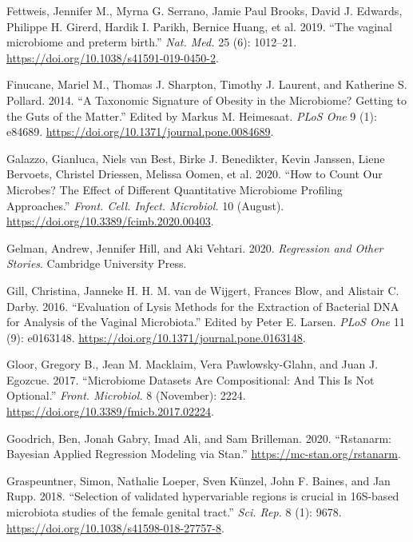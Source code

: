 \documentclass[
]{article}
\newlength{\cslhangindent}
\newlength{\cslentryspacingunit} %
\newenvironment{CSLReferences}[2] %
 {%
  \setlength{\parindent}{0pt}
  \ifodd #1
  \let\oldpar\par
  \def\par{\hangindent=\cslhangindent\oldpar}
  \fi
  \setlength{\parskip}{#2\cslentryspacingunit}
 }%
 {}
\begin{document}
\begin{CSLReferences}{1}{0}
\leavevmode{}%
Fettweis, Jennifer M., Myrna G. Serrano, Jamie Paul Brooks, David J. Edwards, Philippe H. Girerd, Hardik I. Parikh, Bernice Huang, et al. 2019. {``{The vaginal microbiome and preterm birth}.''} \emph{Nat. Med.} 25 (6): 1012--21. \url{https://doi.org/10.1038/s41591-019-0450-2}.

\leavevmode{}%
Finucane, Mariel M., Thomas J. Sharpton, Timothy J. Laurent, and Katherine S. Pollard. 2014. {``{A Taxonomic Signature of Obesity in the Microbiome? Getting to the Guts of the Matter}.''} Edited by Markus M. Heimesaat. \emph{PLoS One} 9 (1): e84689. \url{https://doi.org/10.1371/journal.pone.0084689}.

\leavevmode{}%
Galazzo, Gianluca, Niels van Best, Birke J. Benedikter, Kevin Janssen, Liene Bervoets, Christel Driessen, Melissa Oomen, et al. 2020. {``{How to Count Our Microbes? The Effect of Different Quantitative Microbiome Profiling Approaches}.''} \emph{Front. Cell. Infect. Microbiol.} 10 (August). \url{https://doi.org/10.3389/fcimb.2020.00403}.

\leavevmode{}%
Gelman, Andrew, Jennifer Hill, and Aki Vehtari. 2020. \emph{Regression and Other Stories}. Cambridge University Press.

\leavevmode{}%
Gill, Christina, Janneke H. H. M. van de Wijgert, Frances Blow, and Alistair C. Darby. 2016. {``{Evaluation of Lysis Methods for the Extraction of Bacterial DNA for Analysis of the Vaginal Microbiota}.''} Edited by Peter E. Larsen. \emph{PLoS One} 11 (9): e0163148. \url{https://doi.org/10.1371/journal.pone.0163148}.

\leavevmode{}%
Gloor, Gregory B., Jean M. Macklaim, Vera Pawlowsky-Glahn, and Juan J. Egozcue. 2017. {``{Microbiome Datasets Are Compositional: And This Is Not Optional}.''} \emph{Front. Microbiol.} 8 (November): 2224. \url{https://doi.org/10.3389/fmicb.2017.02224}.

\leavevmode{}%
Goodrich, Ben, Jonah Gabry, Imad Ali, and Sam Brilleman. 2020. {``Rstanarm: {Bayesian} Applied Regression Modeling via {Stan}.''} \url{https://mc-stan.org/rstanarm}.

\leavevmode{}%
Graspeuntner, Simon, Nathalie Loeper, Sven Künzel, John F. Baines, and Jan Rupp. 2018. {``{Selection of validated hypervariable regions is crucial in 16S-based microbiota studies of the female genital tract}.''} \emph{Sci. Rep.} 8 (1): 9678. \url{https://doi.org/10.1038/s41598-018-27757-8}.


\end{CSLReferences}
\end{document}
